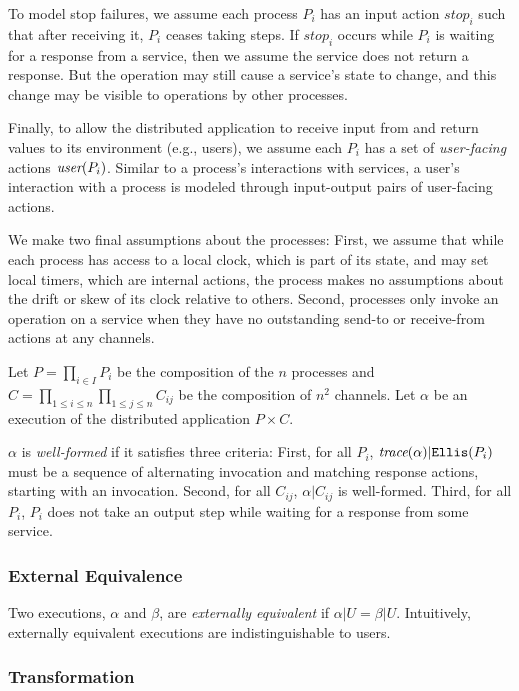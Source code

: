 To model stop failures, we assume each process $P_i$ has an input
action $\textit{stop}_i$ such that after receiving it, $P_i$ ceases taking
steps. If $\textit{stop}_i$ occurs while $P_i$ is waiting for a response from a service, then we assume the service does not return a response. But the operation may still cause a service's state to change, and this change may be visible to operations by other processes.

Finally, to allow the distributed application to receive input from and return values to its environment (e.g., users), we assume each $P_i$ has a set of \textit{user-facing} actions $\operatorname*{\textit{user}}(P_i)$. Similar to a process's interactions with services, a user's interaction with a process is modeled through input-output pairs of user-facing actions.

We make two final assumptions about the processes: First, we assume that while
each process has access to a local clock, which is part of its state, and may
set local timers, which are internal actions, the process makes no assumptions
about the drift or skew of its clock relative to others. Second, processes only
invoke an operation on a service when they have no outstanding send-to or
receive-from actions at any channels.

Let $P = \prod_{i \in I} P_i$ be the composition of the $n$ processes and
$C = \prod_{1 \leq i \leq n} \prod_{1 \leq j \leq n} C_{ij}$ be the composition of $n^2$ channels.
Let $\alpha$ be an execution of the distributed application $P \times C$.

$\alpha$ is \textit{well-formed} if it satisfies three criteria:
First, for all $P_i$, $\operatorname*{\textit{trace}}(\alpha) | \texttt{Ellis}(P_i)$ must be a sequence of alternating invocation and matching response actions, starting with an invocation. Second, for all $C_{ij}$, $\alpha | C_{ij}$ is well-formed. Third, for all $P_i$, $P_i$ does not take an output step while waiting for a response from some service. 

\subsubsection{External Equivalence}
\label{sec:equivalence:preliminaries:equivalence}

Two executions, $\alpha$ and $\beta$, are
\textit{externally equivalent} if $\alpha|U = \beta|U$. Intuitively,
externally equivalent executions are indistinguishable to users.

\subsubsection{Transformation}
\label{sec:equivalence:preliminaries:transform}

